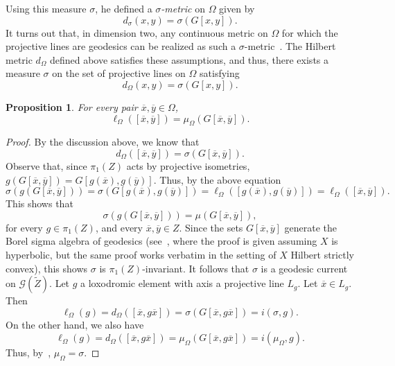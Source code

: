 \documentclass[12pt,article]{amsart}
\numberwithin{equation}{section}
\numberwithin{figure}{section}
\newtheorem{proposition}[equation]{Proposition}
\theoremstyle{definition}
\theoremstyle{plain}
\newcommand*{\wt}[1]{\widetilde{#1}}
\begin{document}
Using this measure $\sigma$, he defined a \emph{$\sigma$-metric} on $\Omega$ given by
\[
d_{\sigma}(x,y)=\sigma(G[x,y]).
\]
It turns out that, in dimension two, any continuous metric on $\Omega$ for which the projective lines are geodesics can be realized as such a $\sigma$-metric~\cite{Pog73:HilbertFourth}. 
The Hilbert metric $d_{\Omega}$ defined above satisfies these assumptions, and thus, there exists a measure $\sigma$ on the set of projective lines on $\Omega$ satisfying 
\[
d_{\Omega}(x,y)=\sigma(G[x,y]).
\]

\begin{proposition}
For every pair $\overline{x},\overline{y} \in \Omega$, \begin{equation}
    \label{HilbertLength}
\ell_{\Omega} ([\overline{x},\overline{y}]) =\mu_{\Omega} ( G[\overline{x},\overline{y}]).
\end{equation}
\end{proposition}
\begin{proof}
    By the discussion above, we know that
    \[
    d_{\Omega} ([\overline{x},\overline{y}]) =\sigma ( G[\overline{x},\overline{y}]).
    \]
    Observe that, since $\pi_1(Z)$ acts by projective isometries, $g(G[\overline{x},\overline{y}])=G[g(\overline{x}),g(\overline{y})]$.
    Thus, by the above equation
    \[
    \sigma(g(G[\overline{x},\overline{y}]))=\sigma(G[g(\overline{x}),g(\overline{y})])=\ell_{\Omega} ([g(\overline{x}),g(\overline{y})])=\ell_{\Omega} ([\overline{x},\overline{y}]).
    \]
    This shows that
    \[
    \sigma(g(G[\overline{x},\overline{y}]))=\mu(G[\overline{x},\overline{y}]),
    \]
    for every $g \in \pi_1(Z)$, and every $\overline{x},\overline{y} \in Z$.
    Since the sets $G[\overline{x},\overline{y}]$ generate the Borel sigma algebra of geodesics (see~\cite[Lemma~A.2]{MZ19:PositivelyRatioed}, where the proof is given assuming $X$ is hyperbolic, but the same proof works verbatim in the setting of $X$ Hilbert strictly convex), this shows $\sigma$ is $\pi_1(Z)$-invariant. It follows that $\sigma$ is a geodesic current on $\mathcal{G}(\wt{Z})$.
    Let $g$ a loxodromic element with axis a projective line $L_g$. Let $\overline{x} \in L_g$. Then
    \[
    \ell_{\Omega}(g)=d_{\Omega} ([\overline{x},g \overline{x}]) =\sigma ( G[\overline{x},g \overline{x}])=i(\sigma, g).
    \]
    On the other hand, we also have
    \[
    \ell_{\Omega}(g)=d_{\Omega} ([\overline{x},g \overline{x}]) =\mu_{\Omega} ( G[\overline{x},g \overline{x}])=i(\mu_{\Omega}, g).
    \]    
    Thus, by~\cite[Th\'eor\`eme~2]{Otal90:SpectreMarqueNegative}, $\mu_{\Omega}=\sigma$.
\end{proof}
\end{document}
